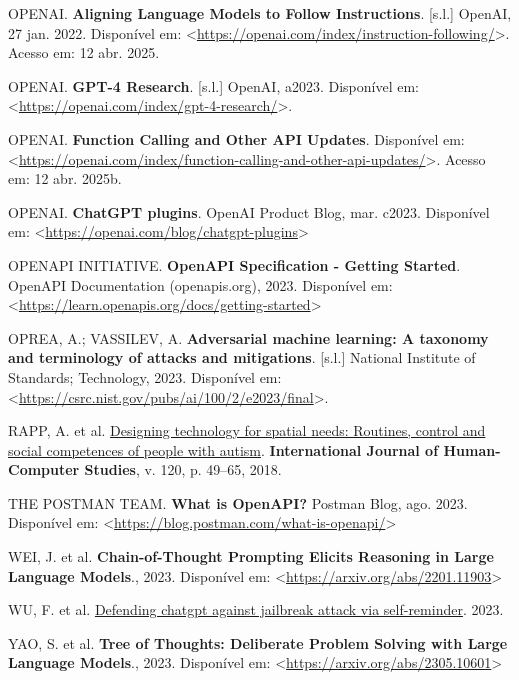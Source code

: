 \documentclass[
]{article}
\newlength{\cslhangindent}
\newenvironment{CSLReferences}[2] %
 {\begin{list}{}{%
  \setlength{\itemindent}{0pt}
  \setlength{\leftmargin}{0pt}
  \setlength{\parsep}{0pt}
  \ifodd #1
   \setlength{\leftmargin}{\cslhangindent}
   \setlength{\itemindent}{-1\cslhangindent}
  \fi
  \setlength{\itemsep}{#2\baselineskip}}}
 {\end{list}}
\begin{document}
\begin{CSLReferences}{0}{1}
OPENAI. \textbf{Aligning Language Models to Follow Instructions}.
{[}s.l.{]} OpenAI, 27 jan. 2022. Disponível em:
\textless{}\url{https://openai.com/index/instruction-following/}\textgreater.
Acesso em: 12 abr. 2025.

OPENAI. \textbf{GPT-4 Research}. {[}s.l.{]} OpenAI, a2023. Disponível
em:
\textless{}\url{https://openai.com/index/gpt-4-research/}\textgreater.

OPENAI. \textbf{Function Calling and Other API Updates}. Disponível em:
\textless{}\url{https://openai.com/index/function-calling-and-other-api-updates/}\textgreater.
Acesso em: 12 abr. 2025b.

OPENAI. \textbf{{ChatGPT plugins}}. OpenAI Product Blog, mar. c2023.
Disponível em:
\textless{}\url{https://openai.com/blog/chatgpt-plugins}\textgreater{}

OPENAPI INITIATIVE. \textbf{{OpenAPI Specification - Getting Started}}.
OpenAPI Documentation (openapis.org), 2023. Disponível em:
\textless{}\url{https://learn.openapis.org/docs/getting-started}\textgreater{}

OPREA, A.; VASSILEV, A. \textbf{Adversarial machine learning: A taxonomy
and terminology of attacks and mitigations}. {[}s.l.{]} National
Institute of Standards; Technology, 2023. Disponível em:
\textless{}\url{https://csrc.nist.gov/pubs/ai/100/2/e2023/final}\textgreater.

RAPP, A. et al.
\href{https://doi.org/10.1016/j.ijhcs.2018.07.005}{Designing technology
for spatial needs: Routines, control and social competences of people
with autism}. \textbf{International Journal of Human-Computer Studies},
v. 120, p. 49--65, 2018.

THE POSTMAN TEAM. \textbf{{What is OpenAPI?}} Postman Blog, ago. 2023.
Disponível em:
\textless{}\url{https://blog.postman.com/what-is-openapi/}\textgreater{}

WEI, J. et al. \textbf{Chain-of-Thought Prompting Elicits Reasoning in
Large Language Models}., 2023. Disponível em:
\textless{}\url{https://arxiv.org/abs/2201.11903}\textgreater{}

WU, F. et al.
\href{https://www.researchsquare.com/article/rs-2873090/v1}{Defending
chatgpt against jailbreak attack via self-reminder}. 2023.

YAO, S. et al. \textbf{Tree of Thoughts: Deliberate Problem Solving with
Large Language Models}., 2023. Disponível em:
\textless{}\url{https://arxiv.org/abs/2305.10601}\textgreater{}

\end{CSLReferences}
\end{document}
